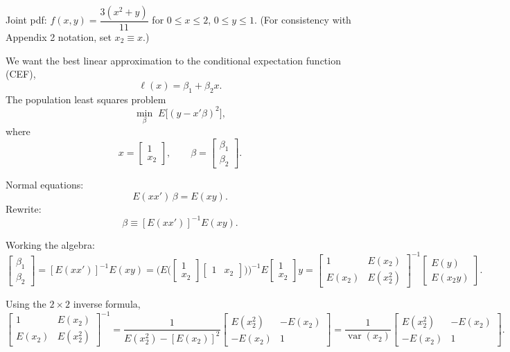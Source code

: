\documentclass[12pt,a4paper]{article}
\begin{document}
Joint pdf: $f(x,y)=\dfrac{3(x^2+y)}{11}$ for $0\leq x\leq 2$, $0\leq y\leq 1$.
(For consistency with Appendix 2 notation, set $x_2 \equiv x$.)

We want the best linear approximation to the conditional expectation function (CEF),
\[
\ell(x)=\beta_1+\beta_2 x.
\]
The population least squares problem
\[
\min_{\beta}\;E\big[(y-x'\beta)^2\big],
\]
where
\[
x=
\begin{bmatrix}
1\\ x_2
\end{bmatrix},
\qquad
\beta=
\begin{bmatrix}
\beta_1\\ \beta_2
\end{bmatrix}.
\]

Normal equations:
\[
E(xx')\,\beta=E(xy).
\]
Rewrite:
\[
\beta \equiv [E(xx')]^{-1}E(xy).
\]

Working the algebra:
\[
\begin{bmatrix}
\beta_1\\ \beta_2
\end{bmatrix}
= [E(xx')]^{-1}E(xy)
=
\Bigg(
E
\Big(
\begin{bmatrix}
1\\ x_2
\end{bmatrix}
\begin{bmatrix}
1 & x_2
\end{bmatrix}
\Big)
\Bigg)^{-1}
E
\begin{bmatrix}
1\\ x_2
\end{bmatrix}
y
=
\begin{bmatrix}
1 & E(x_2)\\
E(x_2) & E(x_2^2)
\end{bmatrix}^{-1}
\begin{bmatrix}
E(y)\\
E(x_2y)
\end{bmatrix}.
\]

Using the $2\times2$ inverse formula,
\[
\begin{bmatrix}
1 & E(x_2)\\
E(x_2) & E(x_2^2)
\end{bmatrix}^{-1}
=
\frac{1}{E(x_2^2)-[E(x_2)]^2}
\begin{bmatrix}
E(x_2^2) & -E(x_2)\\
- E(x_2) & 1
\end{bmatrix}
=
\frac{1}{\operatorname{var}(x_2)}
\begin{bmatrix}
E(x_2^2) & -E(x_2)\\
- E(x_2) & 1
\end{bmatrix}.
\]
\end{document}
